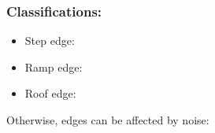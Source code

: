 \subsubsection{Classifications:}
\begin{itemize}
\item 
\begin{minipage}[t]{\linewidth}
\raggedright Step edge: \hspace{3cm}
\end{minipage}
\item 
\begin{minipage}[t]{\linewidth}
\raggedright Ramp edge: \hspace{3cm}
\end{minipage}
\item 
\begin{minipage}[t]{\linewidth}
\raggedright Roof edge: \hspace{3cm}
\end{minipage}
\end{itemize}
\pagebreak
Otherwise, edges can be affected by noise:
